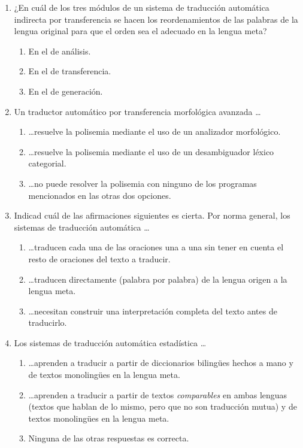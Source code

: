 \begin{enumerate}
\item ¿En cuál de los tres módulos de un sistema de traducción automática indirecta por transferencia se hacen los reordenamientos de las palabras de la lengua original para que el orden sea el adecuado en la lengua meta? \begin{enumerate} \item En el de análisis. \item En el de transferencia. \item En el de generación. \end{enumerate} 

\item Un traductor automático por transferencia morfológica avanzada \ldots \begin{enumerate} \item \ldots resuelve la polisemia mediante el uso de un analizador morfológico. \item \ldots resuelve la polisemia mediante el uso de un desambiguador léxico categorial. \item \ldots no puede resolver la polisemia con ninguno de los programas mencionados en las otras dos opciones. \end{enumerate} 

\item Indicad cuál de las afirmaciones siguientes es cierta. Por norma general, los sistemas de traducción automática \ldots\begin{enumerate} \item \ldots traducen cada una de las oraciones una a una sin tener en cuenta el resto de oraciones del texto a traducir. \item \ldots traducen directamente (palabra por palabra) de la lengua origen a la lengua meta. \item \ldots necesitan construir una interpretación completa del texto antes de traducirlo. \end{enumerate} 

\item Los sistemas de traducción automática estadística \ldots\begin{enumerate} \item \ldots aprenden a traducir a partir de diccionarios bilingües hechos a mano y de textos monolingües en la lengua meta. \item \ldots aprenden a traducir a partir de textos \emph{comparables} en ambas lenguas (textos que hablan de lo mismo, pero que no son traducción mutua) y de textos monolingües en la lengua meta. \item Ninguna de las otras respuestas es correcta. \end{enumerate} 


\end{enumerate}
